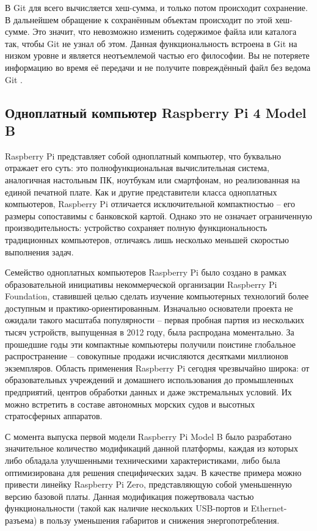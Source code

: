 В Git для всего вычисляется хеш-сумма, и только потом происходит сохранение. В
дальнейшем обращение к сохранённым объектам происходит по этой хеш-сумме. Это
значит, что невозможно изменить содержимое файла или каталога так, чтобы Git не узнал об этом. Данная функциональность встроена в Git на низком уровне и является неотъемлемой частью его философии. Вы не потеряете информацию во время её передачи и не получите повреждённый файл без ведома Git \cite{ProGit}.

\subsection{Одноплатный компьютер Raspberry Pi 4 Model B}

Raspberry Pi представляет собой одноплатный компьютер, что буквально отражает его суть: это полнофункциональная вычислительная система, аналогичная настольным ПК, ноутбукам или смартфонам, но реализованная на единой печатной плате. Как и другие представители класса одноплатных компьютеров, Raspberry Pi отличается исключительной компактностью -- его размеры сопоставимы с банковской картой. Однако это не означает ограниченную производительность: устройство сохраняет полную функциональность традиционных компьютеров, отличаясь лишь несколько меньшей скоростью выполнения задач.

Семейство одноплатных компьютеров Raspberry Pi было создано в рамках образовательной инициативы некоммерческой организации Raspberry Pi Foundation, ставившей целью сделать изучение компьютерных технологий более доступным и практико-ориентированным. Изначально основатели проекта не ожидали такого масштаба популярности -- первая пробная партия из нескольких тысяч устройств, выпущенная в 2012 году, была распродана моментально. За прошедшие годы эти компактные компьютеры получили поистине глобальное распространение -- совокупные продажи исчисляются десятками миллионов экземпляров. Область применения Raspberry Pi сегодня чрезвычайно широка: от образовательных учреждений и домашнего использования до промышленных предприятий, центров обработки данных и даже экстремальных условий. Их можно встретить в составе автономных морских судов и высотных стратосферных аппаратов.

С момента выпуска первой модели Raspberry Pi Model B было разработано значительное количество модификаций данной платформы, каждая из которых либо обладала улучшенными техническими характеристиками, либо была оптимизирована для решения специфических задач. В качестве примера можно привести линейку Raspberry Pi Zero, представляющую собой уменьшенную версию базовой платы. Данная модификация пожертвовала частью функциональности (такой как наличие нескольких USB-портов и Ethernet-разъема) в пользу уменьшения габаритов и снижения энергопотребления.

